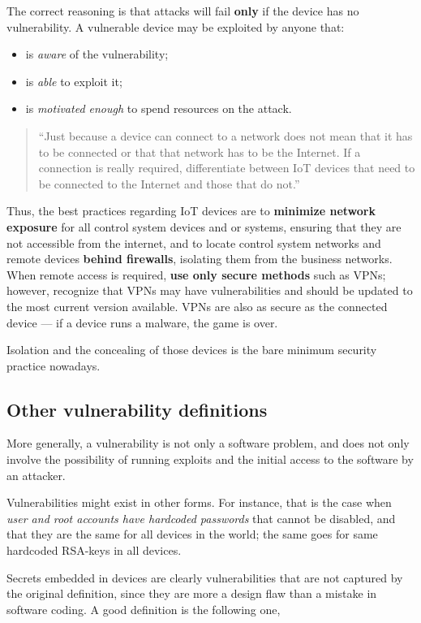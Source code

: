 \documentclass[10pt]{extreport}
\begin{document}
The correct reasoning is that attacks will fail \textbf{only} if the device has
no vulnerability. A vulnerable device may be exploited by anyone that:
\begin{itemize}
    \item is \emph{aware} of the vulnerability;
    \item is \emph{able} to exploit it;
    \item is \emph{motivated enough} to spend resources on the attack.
\end{itemize}

\begin{quote}
``Just because a device can connect to a network does not mean that it has to be
connected or that that network has to be the Internet. If a connection is
really required, differentiate between IoT devices that need to be connected to
the Internet and those that do not.''
\end{quote}

Thus, the best practices regarding IoT devices are to \textbf{minimize network
exposure} for all control system devices and or systems, ensuring that they are
not accessible from the internet, and to locate control system networks and
remote devices \textbf{behind firewalls}, isolating them from the business
networks. When remote access is required, \textbf{use only secure methods} such
as VPNs; however, recognize that VPNs may have vulnerabilities and should be
updated to the most current version available. VPNs are also as secure as the
connected device --- if a device runs a malware, the game is over.

Isolation and the concealing of those devices is the bare minimum security
practice nowadays.


\subsection{Other vulnerability definitions}

More generally, a vulnerability is not only a software problem, and does not
only involve the possibility of running exploits and the initial access to the
software by an attacker.

Vulnerabilities might exist in other forms. For instance, that is the case when
\emph{user and root accounts have hardcoded passwords} that cannot be disabled,
and that they are the same for all devices in the world; the same goes for same
hardcoded RSA-keys in all devices.

Secrets embedded in devices are clearly vulnerabilities that are not captured
by the original definition, since they are more a design flaw than a mistake in
software coding. A good definition is the following one,
\end{document}
